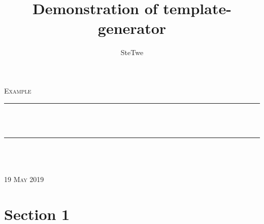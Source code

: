 \documentclass[11pt, a4paper]{article}
\author{SteTwe}
\title{Demonstration of template-generator}
\makeatletter
\def\printtitle{                 
    {\large \@title}}
\def\printauthor{                  
    {\large \@author}}
\makeatother
\begin{document}
\begin{titlepage}
\newcommand{\HRule}{\rule{\linewidth}{0.5mm}} 
\center 

\textsc{\LARGE Example}\\[1.5cm] 
\HRule \\[0.4cm]

{\huge \bfseries \printtitle}\\[0.4cm] 
\HRule \\[0.4cm]

\Large \emph{%
					}\\
 \textsc{\printauthor}\\[3cm]

{\large \textsc{19 May 2019}}\\[3cm] 

\vfill 
\end{titlepage}
\tableofcontents
{}
\newpage
{}
\section{Section 1}	
\end{document}
